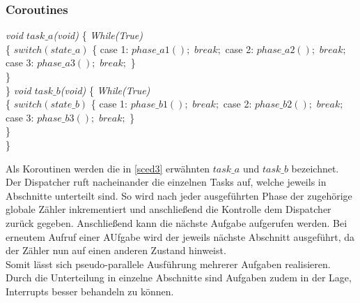 \subsubsection{Coroutines}

\begin{algorithm}
\label{sced3}
\begin{algorithmic}[1]

\BState \textit{void $task\_a$(void)}
\{
\BState \textit{While(True)}\\
\{
\State $switch(state\_a)$
\{
\State case 1: $phase\_a1();$
\State $break;$
\State case 2: $phase\_a2();$
\State $break;$
\State case 3: $phase\_a3();$
\State $break;$
\}\\
\}\\
\}
\newline
\BState \textit{void $task\_b$(void)}
\{
\BState \textit{While(True)}\\
\{
\State $switch(state\_b)$
\{
\State case 1: $phase\_b1();$
\State $break;$
\State case 2: $phase\_b2();$
\State $break;$
\State case 3: $phase\_b3();$
\State $break;$
\}\\
\}\\
\}


\end{algorithmic}
\end{algorithm}

Als Koroutinen werden die in \ref{sced3} erwähnten $task\_a$ und $task\_b$ bezeichnet. Der Dispatcher ruft nacheinander die einzelnen Tasks auf, welche jeweils in Abschnitte unterteilt sind. So wird nach jeder ausgeführten Phase der zugehörige globale Zähler inkrementiert und anschließend die Kontrolle dem Dispatcher zurück gegeben. Anschließend kann die nächste Aufgabe aufgerufen werden. Bei erneutem Aufruf einer AUfgabe wird der jeweils nächste Abschnitt ausgeführt, da der Zähler nun auf einen anderen Zustand hinweist.\\
Somit lässt sich pseudo-parallele Ausführung mehrerer Aufgaben realisieren. Durch die Unterteilung in einzelne Abschnitte sind Aufgaben zudem in der Lage, Interrupts besser behandeln zu können.
\newpage
